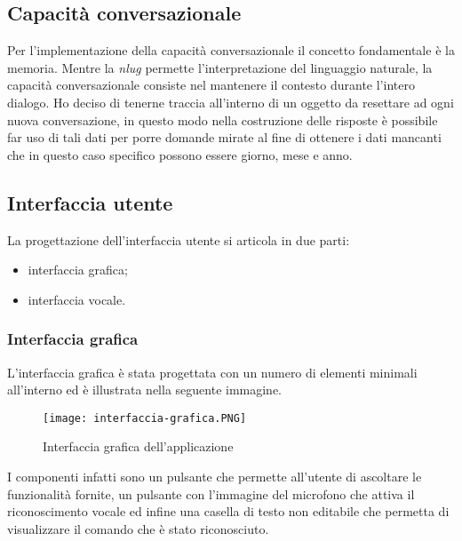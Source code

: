 	\subsection{Capacità conversazionale}
	Per l'implementazione della capacità conversazionale il concetto fondamentale è la memoria. Mentre la \emph{\gls{nlug}} permette l'interpretazione del linguaggio naturale, la capacità conversazionale consiste nel mantenere il contesto durante l'intero dialogo. Ho deciso di tenerne traccia all'interno di un oggetto da resettare ad ogni nuova conversazione, in questo modo nella costruzione delle risposte è possibile far uso di tali dati per porre domande mirate al fine di ottenere i dati mancanti che in questo caso specifico possono essere giorno, mese e anno.
	\subsection{Interfaccia utente}
	La progettazione dell'interfaccia utente si articola in due parti:
	\begin{itemize}
		\item interfaccia grafica;
		\item interfaccia vocale.
	\end{itemize}
		\subsubsection{Interfaccia grafica}
		L'interfaccia grafica è stata progettata con un numero di elementi minimali all'interno ed è illustrata nella seguente immagine.
		
		\begin{figure}[htbp]
			\begin{center}
				\texttt{[image: interfaccia-grafica.PNG]}
				\caption{Interfaccia grafica dell'applicazione}
			\end{center}
		\end{figure}
	
		I componenti infatti sono un pulsante che permette all'utente di ascoltare le funzionalità fornite, un pulsante con l'immagine del microfono che attiva il riconoscimento vocale ed infine una casella di testo non editabile che permetta di visualizzare il comando che è stato riconosciuto.		
